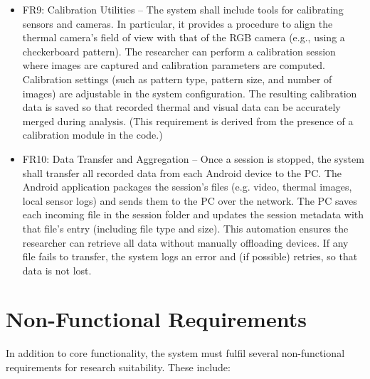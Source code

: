 \begin{itemize}
    \item FR9: Calibration Utilities -- The system shall include tools for calibrating sensors and cameras. In particular, it provides a procedure to align the thermal camera's field of view with that of the RGB camera (e.g., using a checkerboard pattern). The researcher can perform a calibration session where images are captured and calibration parameters are computed. Calibration settings (such as pattern type, pattern size, and number of images) are adjustable in the system configuration. The resulting calibration data is saved so that recorded thermal and visual data can be accurately merged during analysis. (This requirement is derived from the presence of a calibration module in the code.)

    \item FR10: Data Transfer and Aggregation -- Once a session is stopped, the system shall transfer all recorded data from each Android device to the PC. The Android application packages the session's files (e.g. video, thermal images, local sensor logs) and sends them to the PC over the network. The PC saves each incoming file in the session folder and updates the session metadata with that file's entry (including file type and size). This automation ensures the researcher can retrieve all data without manually offloading devices. If any file fails to transfer, the system logs an error and (if possible) retries, so that data is not lost.
\end{itemize}

\section{Non-Functional Requirements}
In addition to core functionality, the system must fulfil several non-functional requirements for research suitability. These include:


